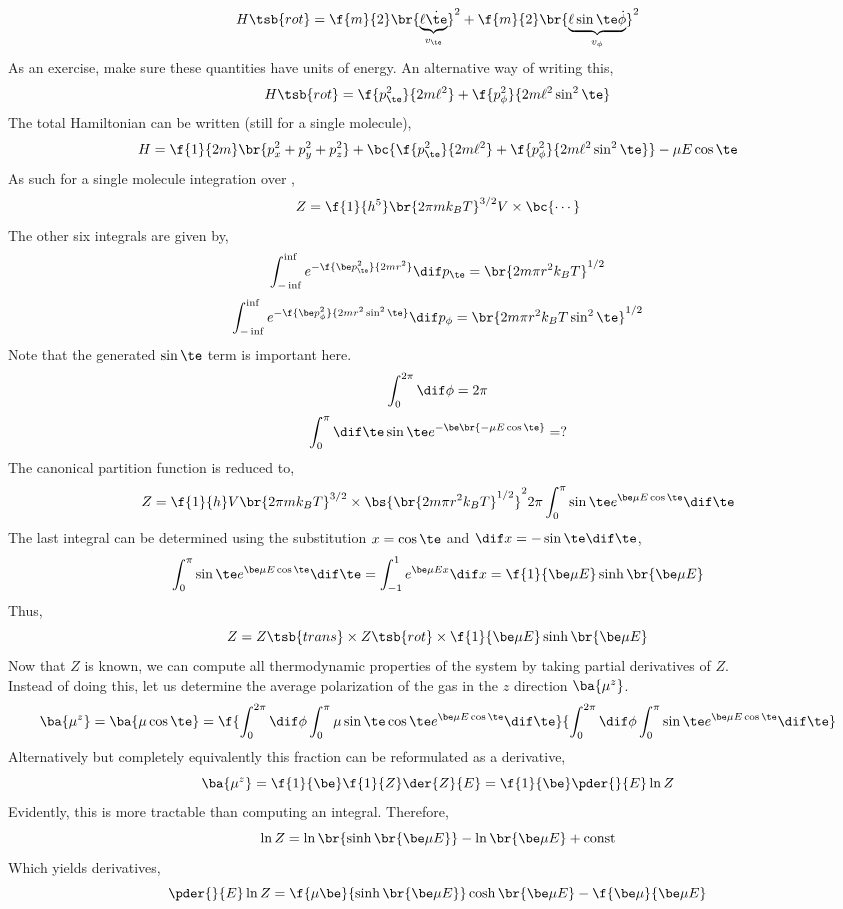 \documentclass{article}
\begin{document}
\[ H\tsb{rot} = \f{m}{2}\br{\underbrace{\ell \dot{\te}}_{v_\te}}^2 + \f{m}{2} \br{\underbrace{\ell \sin \te \dot{\phi}}_{v_\phi}}^2 \]
As an exercise, make sure these quantities have units of energy. An alternative way of writing this,
\[ H\tsb{rot} = \f{p_\te^2}{2m \ell^2} + \f{p_\phi^2}{2m \ell^2 \sin^2 \te} \]
The total Hamiltonian can be written (still for a single molecule),
\[ H = \f{1}{2m}\br{p_x^2 + p_y^2 + p_z^2} + \bc{\f{p_\te^2}{2m \ell^2} + \f{p_\phi^2}{2m \ell^2 \sin^2 \te}} - \mu E \cos \te \]
As such for a single molecule integration over $ $,
\[ Z = \f{1}{h^5}\br{2\pi m k_B T}^{3/2} V \times \bc{\cdots} \]
The other six integrals are given by,
\[ \int_{-\inf}^{\inf} e^{-\f{\be p_\te^2}{2mr^2}} \dif p_\te = \br{2m\pi r^2 k_B T}^{1/2} \]
\[ \int_{-\inf}^{\inf} e^{-\f{\be p_\phi^2}{2mr^2\sin^2 \te}}  \dif p_\phi = \br{2m\pi r^2 k_B T \sin^2 \te}^{1/2} \]
Note that the generated $\sin \te$ term is important here.
\[ \int_{0}^{2\pi} \dif \phi = 2\pi \]
\[ \int_{0}^{\pi} \dif \te \sin \te e^{-\be\br{-\mu E \cos \te}} = ? \]
The canonical partition function is reduced to,
\[ Z = \f{1}{h} V \br{2\pi m k_B T}^{3/2} \times \bs{\br{2m \pi r^2 k_B T}^{1/2}}^2 2 \pi \int_{0}^{\pi} \sin \te e^{\be \mu E \cos \te} \dif \te \]
The last integral can be determined using the substitution $x = \cos \te$ and $\dif x = - \sin \te \dif \te$,
\[ \int_{0}^{\pi} \sin \te e^{\be \mu E \cos \te} \dif \te = \int_{-1}^{1} e^{\be \mu E x} \dif x = \f{1}{\be \mu E} \sinh \br{\be \mu E} \]
Thus,
\[ Z = Z\tsb{trans} \times Z\tsb{rot} \times  \f{1}{\be \mu E} \sinh \br{\be \mu E} \]
Now that $Z$ is known, we can compute all thermodynamic properties of the system by taking partial derivatives of $Z$.\\

Instead of doing this, let us determine the average polarization of the gas in the $z$ direction $\ba{\mu^z}$.
\[ \ba{\mu^z} = \ba{\mu \cos \te} = \f{\int_{0}^{2\pi} \dif \phi \int_{0}^{\pi} \mu\sin \te  \cos \te e^{\be \mu E \cos \te} \dif \te}{\int_{0}^{2\pi} \dif \phi \int_{0}^{\pi} \sin \te e^{\be \mu E \cos \te}
\dif \te} \]
Alternatively but completely equivalently this fraction can be reformulated as a derivative,
\[ \ba{\mu^z} = \f{1}{\be}\f{1}{Z} \der{Z}{E} = \f{1}{\be}\pder{}{E} \ln Z  \]
Evidently, this is more tractable than computing an integral. Therefore,
\[ \ln Z = \ln \br{\sinh \br{\be \mu E}} - \ln \br{\be \mu E} + \text{const} \]
Which yields derivatives,
\[ \pder{}{E}\ln Z = \f{\mu \be}{\sinh\br{\be \mu E}}\cosh\br{\be \mu E} - \f{\be \mu}{\be \mu E} \]
\end{document}
